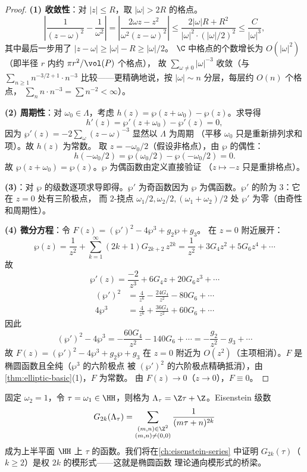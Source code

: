 \begin{proof}
\textbf{(1) 收敛性}：对 $|z| \leq R$，取 $|\omega| > 2R$ 的格点。
\[
  \left|\frac{1}{(z-\omega)^2} - \frac{1}{\omega^2}\right|
  = \left|\frac{2\omega z - z^2}{\omega^2(z - \omega)^2}\right|
  \leq \frac{2|\omega| R + R^2}{|\omega|^2 \cdot (|\omega|/2)^2}
  \leq \frac{C}{|\omega|^3},
\]
其中最后一步用了 $|z - \omega| \geq |\omega| - R \geq |\omega|/2$。
$\C$ 中格点的个数增长为 $O(|\omega|^2)$（即半径 $r$ 内约 $\pi r^2/\vol(P)$ 个格点），
故 $\sum_{\omega \neq 0} |\omega|^{-3}$ 收敛（与 $\sum_{n \geq 1} n^{-3/2+1} \cdot n^{-3}$
比较——更精确地说，按 $|\omega| \sim n$ 分层，每层约 $O(n)$ 个格点，
$\sum_n n \cdot n^{-3} = \sum n^{-2} < \infty$）。

\textbf{(2) 周期性}：对 $\omega_0 \in \Lambda$，考虑
$h(z) = \wp(z + \omega_0) - \wp(z)$。求导得
\[
  h'(z) = \wp'(z + \omega_0) - \wp'(z) = 0,
\]
因为 $\wp'(z) = -2\sum_\omega (z-\omega)^{-3}$ 显然以 $\Lambda$ 为周期
（平移 $\omega_0$ 只是重新排列求和项）。故 $h(z)$ 为常数。
取 $z = -\omega_0/2$（假设非格点），由 $\wp$ 的偶性：
\[
  h(-\omega_0/2) = \wp(\omega_0/2) - \wp(-\omega_0/2) = 0.
\]
故 $\wp(z + \omega_0) = \wp(z)$。$\wp$ 为偶函数由定义直接验证
（$z \mapsto -z$ 只是重排格点）。

\textbf{(3)}：对 $\wp$ 的级数逐项求导即得。$\wp'$ 为奇函数因为
$\wp$ 为偶函数。$\wp'$ 的阶为 $3$：它在 $z = 0$ 处有三阶极点，
而 $2$-挠点 $\omega_1/2, \omega_2/2, (\omega_1+\omega_2)/2$ 处
$\wp'$ 为零（由奇性和周期性）。

\textbf{(4) 微分方程}：令 $F(z) = (\wp')^2 - 4\wp^3 + g_2\wp + g_3$。
在 $z = 0$ 附近展开：
\[
  \wp(z) = \frac{1}{z^2} + \sum_{k=1}^{\infty} (2k+1)G_{2k+2}\, z^{2k}
  = \frac{1}{z^2} + 3G_4 z^2 + 5G_6 z^4 + \cdots
\]
故
\[
  \wp'(z) = \frac{-2}{z^3} + 6G_4 z + 20 G_6 z^3 + \cdots
\]
\begin{align}
  (\wp')^2 &= \frac{4}{z^6} - \frac{24 G_4}{z^2} - 80 G_6 + \cdots \\
  4\wp^3 &= \frac{4}{z^6} + \frac{36 G_4}{z^2} + 60 G_6 + \cdots
\end{align}
因此
\[
  (\wp')^2 - 4\wp^3 = -\frac{60 G_4}{z^2} - 140 G_6 + \cdots
  = -\frac{g_2}{z^2} - g_3 + \cdots
\]
故 $F(z) = (\wp')^2 - 4\wp^3 + g_2\wp + g_3$ 在 $z = 0$ 附近为
$O(z^2)$（主项相消）。$F$ 是椭圆函数且全纯（$\wp^3$ 的六阶极点
被 $(\wp')^2$ 的六阶极点精确抵消），由\cref{thm:elliptic-basic}(1)，$F$ 为常数。
由 $F(z) \to 0$（$z \to 0$），$F \equiv 0$。
\end{proof}

\begin{remark}[从椭圆函数到模形式]
\label{rem:elliptic-to-modular}
固定 $\omega_2 = 1$，令 $\tau = \omega_1 \in \HH$，则格为
$\Lambda_\tau = \Z\tau + \Z$。Eisenstein 级数
\[
  G_{2k}(\Lambda_\tau) = \sum_{\substack{(m,n) \in \Z^2 \\ (m,n) \neq (0,0)}}
  \frac{1}{(m\tau + n)^{2k}}
\]
成为上半平面 $\HH$ 上 $\tau$ 的函数。我们将在\cref{ch:eisenstein-series}
中证明 $G_{2k}(\tau)$（$k \geq 2$）是权 $2k$ 的模形式——这就是椭圆函数
理论通向模形式的桥梁。
\end{remark}


